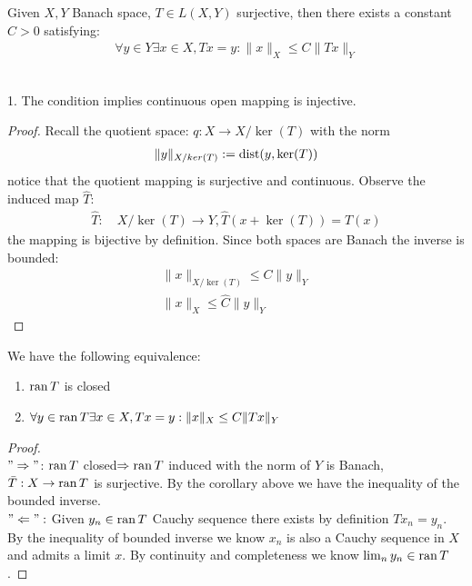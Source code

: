 \begin{corollary}
	Given $X, Y$ Banach space, $T \in L(X, Y)$ surjective, then there exists a constant $C > 0$ satisfying:
	\begin{align*}
		\forall y \in Y \exists x \in X, Tx = y: \|x\|_X \le C \|Tx\|_Y
	\end{align*}
\end{corollary}
\begin{remark}\quad\\
1. The condition implies continuous open mapping is injective.  
\end{remark}
\begin{proof}
Recall the quotient space: $q : X \rightarrow X \slash \ker(T)$ with the norm
\begin{align*}
	\|y\|_{X\slash ker(T)} := \operatorname*{dist}(y, \ker(T))
\end{align*}
notice that the quotient mapping is surjective and continuous. Observe the induced map $\hat{T}$:
\begin{align*}
	\hat{T}:\quad X\slash \ker(T) \rightarrow Y, \hat{T}(x + \ker(T)) = T(x)
\end{align*}
the mapping is bijective by definition. Since both spaces are Banach the inverse is bounded:
\begin{align*}
	\|x\|_{X\slash\ker(T)} \le C \|y\|_Y\\
	\|x\|_X \le \hat{C} \|y\|_Y
\end{align*}
\end{proof}

\begin{corollary}
		We have the following equivalence:
	\begin{enumerate}
		\item $\operatorname{ran} T$ is closed
		\item $\forall y \in \operatorname{ran} T \exists x \in X, Tx = y: \|x\|_X \le C \|Tx\|_Y$
	\end{enumerate}
\end{corollary}
\begin{proof}
	\quad\\
	$"\Rightarrow" $: $\operatorname{ran} T$ closed$\Rightarrow \operatorname{ran} T$ induced with the norm of $Y$ is Banach, $\bar{T}: X \rightarrow \operatorname{ran} T$ is surjective. By the corollary above we have the inequality of the bounded inverse. \\
	$"\Leftarrow":$ Given $y_n \in \operatorname{ran} T$ Cauchy sequence there exists by definition $Tx_n = y_n$. By the inequality of bounded inverse we know $x_n$ is also a Cauchy sequence in $X$ and admits a limit $x$. By continuity and completeness we know $\lim_n y_n \in \operatorname{ran} T$. 
\end{proof}

